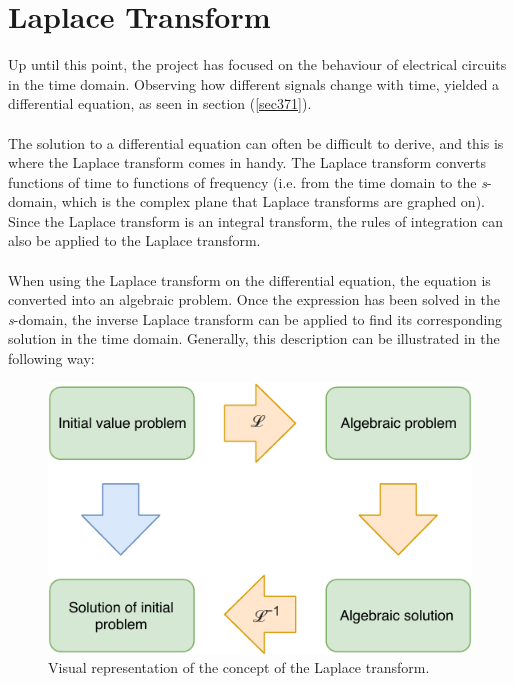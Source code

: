 \chapter{Laplace Transform}
Up until this point, the project has focused on the behaviour of electrical circuits in the time domain. Observing how different signals change with time, yielded a differential equation, as seen in section (\ref{sec371}).
\\ \\
The solution to a differential equation can often be difficult to derive, and this is where the Laplace transform comes in handy. The Laplace transform converts functions of time to functions of frequency (i.e. from the time domain to the \textit{s}-domain, which is the complex plane that Laplace transforms are graphed on). Since the Laplace transform is an integral transform, the rules of integration can also be applied to the Laplace transform.
\\ \\
\noindent When using the Laplace transform on the differential equation, the equation is converted into an algebraic problem. Once the expression has been solved in the \textit{s}-domain, the inverse Laplace transform can be applied to find its corresponding solution in the time domain. Generally, this description can be illustrated in the following way:
\begin{figure}[H]
\center
\includegraphics[scale=1]{fig/img/laplace_circ.pdf}
\caption{Visual representation of the concept of the Laplace transform.}
\label{lpsol}
\end{figure}

